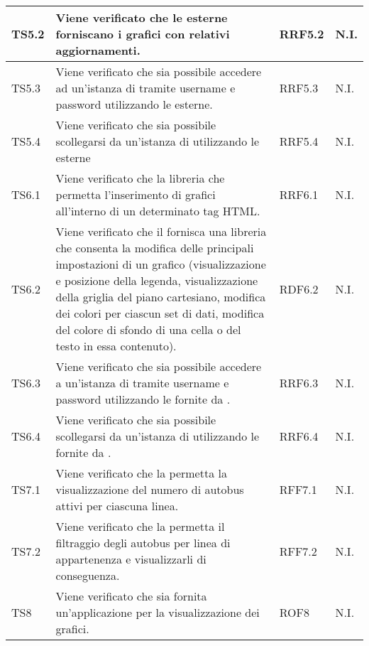 \begin{longtabu}{| X[0.5] | X | X[0.5] | X[0.4] |}
TS5.2 & Viene verificato che le  esterne forniscano i grafici con relativi aggiornamenti. & RRF5.2 & N.I.\\ \hline

TS5.3 & Viene verificato che sia possibile accedere ad un'istanza di  tramite username e password utilizzando le  esterne. & RRF5.3 & N.I.\\ \hline

TS5.4 & Viene verificato che sia possibile scollegarsi da un'istanza di  utilizzando le  esterne & RRF5.4 & N.I.\\ \hline

TS6.1 & Viene verificato che la libreria che permetta l'inserimento di grafici all'interno di un determinato tag HTML. & RRF6.1 & N.I.\\ \hline

TS6.2 & Viene verificato che il  fornisca una libreria che consenta la modifica delle principali impostazioni di un grafico (visualizzazione e posizione della legenda, visualizzazione della griglia del piano cartesiano, modifica dei colori per ciascun set di dati, modifica del colore di sfondo di una cella o del testo in essa contenuto). & RDF6.2 & N.I.\\ \hline

TS6.3 & Viene verificato che sia possibile accedere a un'istanza di  tramite username e password utilizzando le  fornite da . & RRF6.3 & N.I.\\ \hline

TS6.4 & Viene verificato che sia possibile scollegarsi da un'istanza di  utilizzando le  fornite da . & RRF6.4 & N.I.\\ \hline

TS7.1 & Viene verificato che la  permetta la visualizzazione del numero di autobus attivi per ciascuna linea. & RFF7.1 & N.I.\\ \hline

TS7.2 & Viene verificato che la  permetta il filtraggio degli autobus per linea di appartenenza e visualizzarli di conseguenza. & RFF7.2 & N.I.\\ \hline

TS8 & Viene verificato che sia fornita un'applicazione  per la visualizzazione dei grafici. & ROF8 & N.I.\\ \hline


\end{longtabu}
